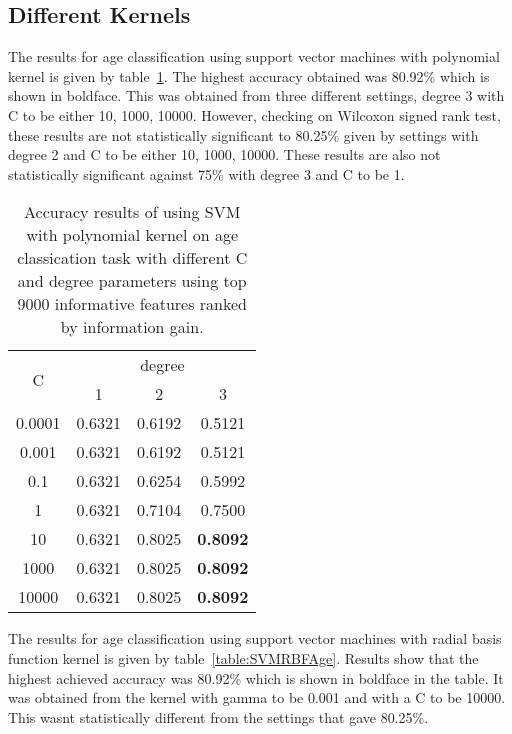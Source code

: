 \documentclass[a4paper]{llncs}
\begin{document}
\subsection{Different Kernels}
The results for age classification using support vector machines with polynomial kernel is given by table~\ref{table:SVMPolyAge}. The highest accuracy obtained was 80.92\% which is shown in boldface. This was obtained from three different settings, degree 3 with C to be either 10, 1000, 10000. However, checking on Wilcoxon signed rank test, these results are not statistically significant to 80.25\% given by settings with degree 2 and C to be either 10, 1000, 10000. These results are also not statistically significant against 75\% with degree 3 and C to be 1. 

\begin{table}[!htbp]
\centering
\begin{tabular}{|c|c|c|c|}
\hline
\multirow{2}{*}{C} & \multicolumn{3}{c|}{degree}       \\ \cline{2-4} 
                   & 1      & 2      & 3               \\ \hline
0.0001             & 0.6321 & 0.6192 & 0.5121          \\ \hline
0.001              & 0.6321 & 0.6192 & 0.5121          \\ \hline
0.1                & 0.6321 & 0.6254 & 0.5992          \\ \hline
1                  & 0.6321 & 0.7104 & 0.7500          \\ \hline
10                 & 0.6321 & 0.8025 & \textbf{0.8092} \\ \hline
1000               & 0.6321 & 0.8025 & \textbf{0.8092} \\ \hline
10000              & 0.6321 & 0.8025 & \textbf{0.8092} \\ \hline
\end{tabular}
\caption{Accuracy results of using SVM with polynomial kernel on age classication task with different C and degree parameters using top 9000 informative features ranked by information gain.}
\label{table:SVMPolyAge}
\end{table}

The results for age classification using support vector machines with radial basis function kernel is given by table~\ref{table:SVMRBFAge}. Results show that the highest achieved accuracy was 80.92\% which is shown in boldface in the table. It was obtained from the kernel with gamma to be 0.001 and with a C to be 10000. This wasnt statistically different from the settings that gave 80.25\%.  
\end{document}

